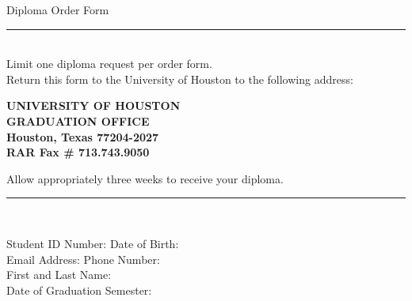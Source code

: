 \documentclass{article}
\begin{document}
\begin{center}
    {\LARGE Diploma Order Form} \\
    \vspace{0.5cm}
    \noindent\rule{15cm}{0.4pt} \\
    \vspace{0.3cm}
    Limit one diploma request per order form. \\
    Return this form to the University of Houston to the following address:
    \begin{center}
    \noindent
        \textbf{UNIVERSITY OF HOUSTON} \\
        \textbf{GRADUATION OFFICE} \\
        \textbf{Houston, Texas 77204-2027} \\
        \textbf{RAR Fax \# 713.743.9050} \\
    \end{center}
    Allow appropriately three weeks to receive your diploma. \\
    \vspace{0.3cm}
    \noindent\rule{15cm}{0.4pt} \\
    \vspace{0.3cm}
    \begin{flushleft} 
    \vspace*{0.30cm} Student ID Number: 
    \hspace{1cm}
    \vspace*{0.30cm} Date of Birth:  \\
    \vspace*{0.30cm} Email Address: 
    \hspace{1cm}
    \vspace*{0.30cm} Phone Number:  \\
    \vspace*{0.30cm} First and Last Name:  \\
    \vspace*{0.30cm} Date of Graduation
    \hspace{0.5cm}
    \vspace*{0.30cm} Semester: 
    \hspace{0.5cm}

\end{flushleft}
\end{center}
\end{document}
